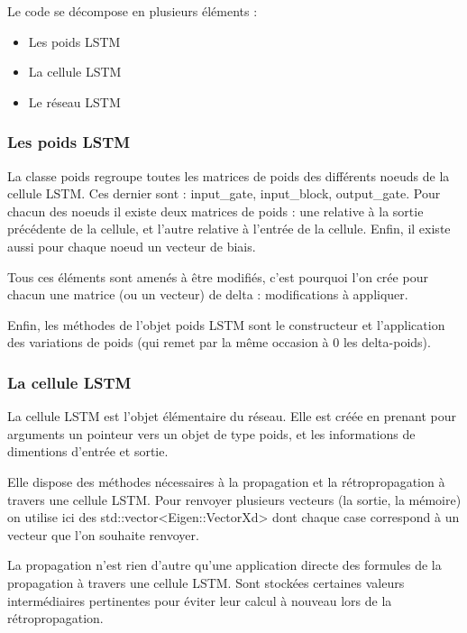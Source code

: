 Le code se décompose en plusieurs éléments : 

\medskip

\begin{itemize}

  \item Les poids LSTM
  \item La cellule LSTM
  \item Le réseau LSTM

\end{itemize}
\subsubsection{Les poids LSTM}

La classe poids regroupe toutes les matrices de poids des différents noeuds
de la cellule LSTM. Ces dernier sont : input\_gate, input\_block, output\_gate.
Pour chacun des noeuds il existe deux matrices de poids : une relative à
la sortie précédente de la cellule, et l'autre relative à l'entrée de la
cellule. Enfin, il existe aussi pour chaque noeud un vecteur de biais.

\medskip

Tous ces éléments sont amenés à être modifiés, c'est pourquoi l'on crée pour
chacun une matrice (ou un vecteur) de delta : modifications à appliquer.

\medskip

Enfin, les méthodes de l'objet poids LSTM sont le constructeur et
l'application des variations de poids (qui remet par la même occasion à 0
les delta-poids).

\subsubsection{La cellule LSTM}

La cellule LSTM est l'objet élémentaire du réseau. Elle est créée en prenant
pour arguments un pointeur vers un objet de type poids, et les informations de
dimentions d'entrée et sortie.

\medskip

Elle dispose des méthodes nécessaires à la propagation et la rétropropagation
à travers une cellule LSTM.
Pour renvoyer plusieurs vecteurs (la sortie, la mémoire) on utilise ici des
std::vector<Eigen::VectorXd> dont chaque case correspond à un vecteur que l'on
souhaite renvoyer.

\medskip

La propagation n'est rien d'autre qu'une application directe des formules de la
propagation à travers une cellule LSTM. Sont stockées certaines valeurs
intermédiaires pertinentes pour éviter leur calcul à nouveau lors de la
rétropropagation.

